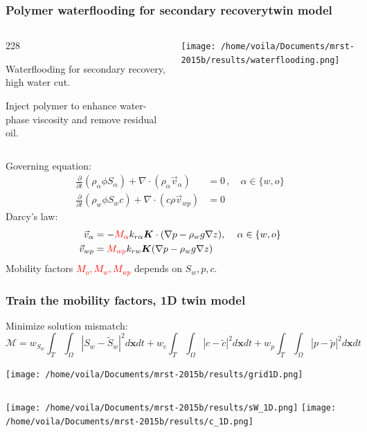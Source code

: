\documentclass{beamer}
\newcommand{\barrow}{\item[\color{darkred}\ding{228}]}
\begin{document}
\begin{frame}
    \frametitle{Polymer waterflooding for secondary recovery\hfill \scriptsize{twin model}}\small
    \begin{columns}
        \begin{dinglist}{228}
            \barrow Waterflooding for secondary recovery, high water cut.
            \barrow Inject polymer to enhance water-phase viscosity and remove residual oil.
        \end{dinglist}
        \begin{center}
            \texttt{[image: /home/voila/Documents/mrst-2015b/results/waterflooding.png]}
        \end{center}
    \end{columns}
    Governing equation:
    \begin{equation*}\begin{split}
        \frac{\partial }{\partial t} \left(\rho_\alpha \phi S_\alpha \right) + \nabla \cdot
        \left( \rho_\alpha \vec{v}_{\alpha} \right) &= 0\,, \quad \alpha \in \{w,o\}\\
        \frac{\partial}{\partial t}\left( \rho_w \phi S_w c \right) + \nabla \cdot
        \left( c \rho \vec{v}_{wp}\right) &= 0        
    \end{split}\end{equation*}
    Darcy's law:
    \begin{equation*}\begin{split}
        \vec{v}_\alpha &= - \textcolor{red}{M_\alpha} k_{r\alpha} \boldsymbol{K} \cdot (\nabla p - \rho_w g \nabla z), \, \quad \alpha \in \{w,o\}\\
        \vec{v}_{wp} &= \textcolor{red}{M_{wp}} k_{rw} \boldsymbol{K} (\nabla p - \rho_{w} g \nabla z)
    \end{split}\end{equation*}
    \vspace{.1cm}
    Mobility factors \textcolor{red}{$M_o, M_w, M_{wp}$} depends on $S_w, p, c$. 
\end{frame}

\begin{frame}
    \frametitle{Train the mobility factors, 1D \hfill \scriptsize{twin model}}\small
    Minimize solution mismatch:
    $$
        \mathcal{M} = w_{S_w}\int_T\int_\Omega |S_w-\tilde{S}_w|^2 d\boldsymbol{x} dt
                    + w_{c}\int_T\int_\Omega |c-\tilde{c}|^2 d\boldsymbol{x} dt 
                    + w_{p}\int_T\int_\Omega |p-\tilde{p}|^2 d\boldsymbol{x} dt
    $$
    \begin{center}
        \texttt{[image: /home/voila/Documents/mrst-2015b/results/grid1D.png]}
    \end{center}
    \begin{columns}
        \centering
        \texttt{[image: /home/voila/Documents/mrst-2015b/results/sW\_1D.png]}
        \centering
        \texttt{[image: /home/voila/Documents/mrst-2015b/results/c\_1D.png]}
    \end{columns}
\end{frame}
\end{document}
